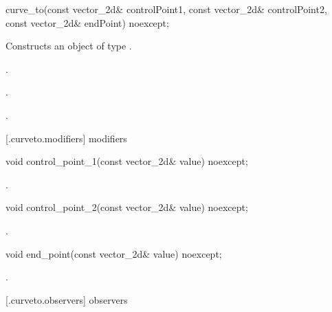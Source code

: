\begin{itemdecl}
    curve_to(const vector_2d& controlPoint1, const vector_2d& controlPoint2,
      const vector_2d& endPoint) noexcept;
\end{itemdecl}
\begin{itemdescr}
	\pnum
	\effects
	Constructs an object of type .
	
	\pnum
	\postconditions
	.

	.

	.

\end{itemdescr}

 [\iotwod.curveto.modifiers]{ modifiers}

\begin{itemdecl}
    void control_point_1(const vector_2d& value) noexcept;
\end{itemdecl}
\begin{itemdescr}
	\pnum
	\postconditions
	.
	
\end{itemdescr}

\begin{itemdecl}
    void control_point_2(const vector_2d& value) noexcept;
\end{itemdecl}
\begin{itemdescr}
	\pnum
	\postconditions
	.
	
\end{itemdescr}

\begin{itemdecl}
    void end_point(const vector_2d& value) noexcept;
\end{itemdecl}
\begin{itemdescr}
	\pnum
	\postconditions
	.
	
\end{itemdescr}

 [\iotwod.curveto.observers]{ observers}

